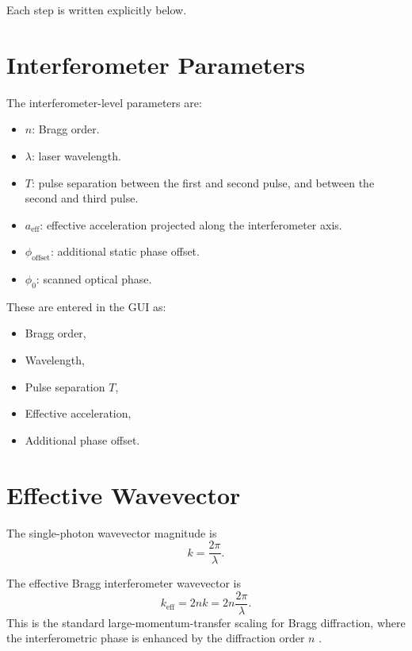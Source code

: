 \documentclass[11pt,a4paper]{article}
\begin{document}
Each step is written explicitly below.

\section{Interferometer Parameters}

The interferometer-level parameters are:

\begin{itemize}[leftmargin=1.5em]
  \item $n$: Bragg order.
  \item $\lambda$: laser wavelength.
  \item $T$: pulse separation between the first and second pulse, and between the second and third pulse.
  \item $a_{\mathrm{eff}}$: effective acceleration projected along the interferometer axis.
  \item $\phi_{\mathrm{offset}}$: additional static phase offset.
  \item $\phi_0$: scanned optical phase.
\end{itemize}

These are entered in the GUI as:

\begin{itemize}[leftmargin=1.5em]
  \item Bragg order,
  \item Wavelength,
  \item Pulse separation $T$,
  \item Effective acceleration,
  \item Additional phase offset.
\end{itemize}

\section{Effective Wavevector}

The single-photon wavevector magnitude is
\begin{equation}
  k = \frac{2\pi}{\lambda}.
\end{equation}

The effective Bragg interferometer wavevector is
\begin{equation}
  k_{\mathrm{eff}} = 2nk = 2n\frac{2\pi}{\lambda}.
\end{equation}
This is the standard large-momentum-transfer scaling for Bragg diffraction, where the interferometric phase is enhanced by the diffraction order $n$ \cite{Giltner1995,Muller2008}.
\end{document}
